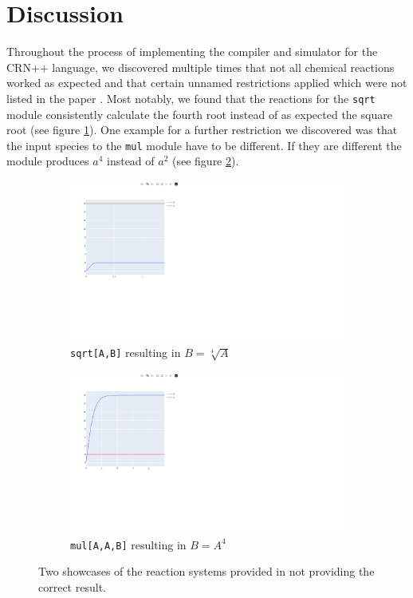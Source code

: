 \section{Discussion}

Throughout the process of implementing the compiler and simulator for the CRN++ language, we discovered multiple times that not all chemical reactions worked as expected and that certain unnamed restrictions applied which were not listed in the paper \cite{soloveichik2018a}. Most notably, we found that the reactions for the \texttt{sqrt} module consistently calculate the fourth root instead of as expected the square root (see figure \ref{fig:subfigure1}). One example for a further restriction we discovered was that the input species to the \texttt{mul} module have to be different. If they are different the module produces $a^4$ instead of $a^2$ (see figure \ref{fig:subfigure2}). 

\begin{figure}[h]
  \centering
  \begin{subfigure}[b]{0.49\textwidth}
    \includegraphics[width=\textwidth]{Figures/sqrt-plot.pdf}
    \caption{\texttt{sqrt[A,B]} resulting in $B=\sqrt[4]{A}$}
    \label{fig:subfigure1}
  \end{subfigure}
  \hfill
  \begin{subfigure}[b]{0.49\textwidth}
    \includegraphics[width=\textwidth]{Figures/mul-plot.pdf}
    \caption{\texttt{mul[A,A,B]} resulting in $B=A^4$}
    \label{fig:subfigure2}
  \end{subfigure}
  \caption{Two showcases of the reaction systems provided in \cite{soloveichik2018a} not providing the correct result.}
  \label{fig:crn-errors}
\end{figure}

